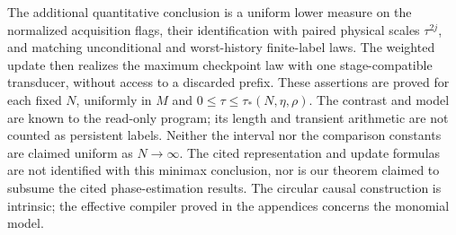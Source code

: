 The additional quantitative conclusion is a uniform lower measure on
the normalized acquisition flags, their identification with paired
physical scales $\tau^{2j}$, and matching unconditional and worst-history
finite-label laws. The weighted update then realizes the maximum
checkpoint law with one stage-compatible transducer, without access
to a discarded prefix. These assertions are proved for each fixed
$N$, uniformly in $M$ and $0\le\tau\le\tau_*(N,\eta,\rho)$.
The contrast and model are known to the read-only program; its length
and transient arithmetic are not counted as persistent labels.
Neither the interval nor the comparison constants are claimed uniform
as $N\to\infty$. The cited representation and update formulas are
not identified with this minimax conclusion, nor is our theorem claimed
to subsume the cited phase-estimation results. The circular causal
construction is intrinsic; the effective compiler proved in the
appendices concerns the monomial model.
